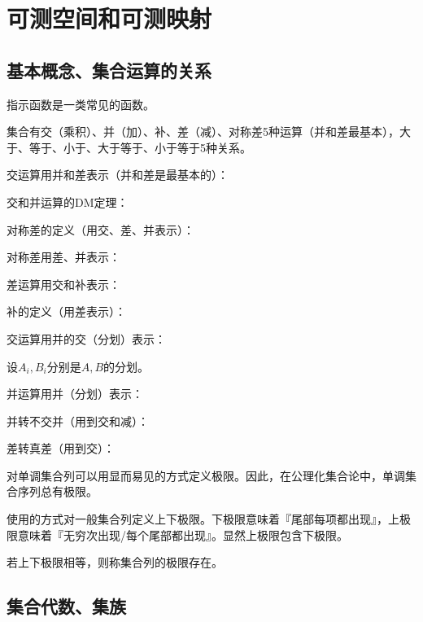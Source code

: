 \chapter{可测空间和可测映射}

\section{基本概念、集合运算的关系}

指示函数是一类常见的函数。


集合有交（乘积）、并（加）、补、差（减）、对称差5种运算（并和差最基本），大于、等于、小于、大于等于、小于等于5种关系。

交运算用并和差表示（并和差是最基本的）：

交和并运算的DM定理：


对称差的定义（用交、差、并表示）：

对称差用差、并表示：

差运算用交和补表示：

补的定义（用差表示）：

交运算用并的交（分划）表示：

设$A_i, B_i$分别是$A, B$的分划。


并运算用并（分划）表示：


并转不交并（用到交和减）：


差转真差（用到交）：


对单调集合列可以用显而易见的方式定义极限。因此，在公理化集合论中，单调集合序列总有极限。

使用的方式对一般集合列定义上下极限。下极限意味着『尾部每项都出现』，上极限意味着『无穷次出现/每个尾部都出现』。显然上极限包含下极限。

若上下极限相等，则称集合列的极限存在。

\section{集合代数、集族}

